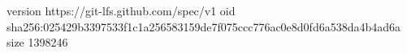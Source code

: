 version https://git-lfs.github.com/spec/v1
oid sha256:025429b3397533f1c1a256583159de7f075ccc776ac0e8d0fd6a538da4b4ad6a
size 1398246
